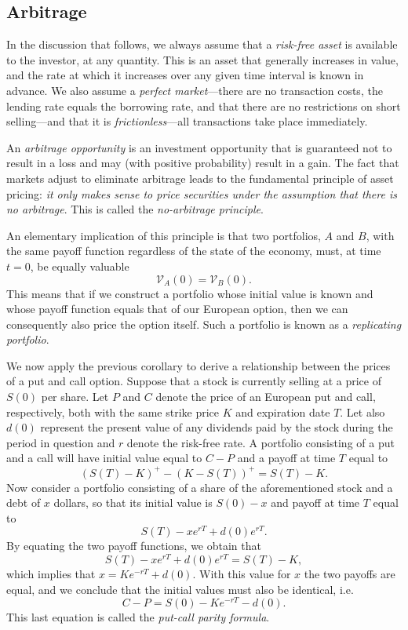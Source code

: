 \documentclass[]{article}
\theoremstyle{definition}
\theoremstyle{remark}
\begin{document}
\subsection{Arbitrage}
In the discussion that follows, we always assume that a \textit{risk-free asset} is available to the investor, at any quantity. This is an asset that generally increases in value, and the rate at which it increases over any given time interval is known in advance. We also assume a \textit{perfect market}---there are no transaction costs, the lending rate equals the borrowing rate, and that there are no restrictions on short selling---and that it is \textit{frictionless}---all transactions take place immediately.
\par
An \textit{arbitrage opportunity} is an investment opportunity that is guaranteed not to result in a loss and may (with positive probability) result in a gain. The fact that markets adjust to eliminate arbitrage leads to the fundamental principle of asset pricing: \textit{it only makes sense to price securities under the assumption that there is no arbitrage}. This is called the \textit{no-arbitrage principle}.
\par 
An elementary implication of this principle is that two portfolios, $A$ and $B$, with the same payoff function regardless of the state of the economy, must, at time $t=0$, be equally valuable\cite{roman2013introduction}
\[\mathcal{V}_{A}(0) = \mathcal{V}_B (0). \]
This means that if we construct a portfolio whose initial value is known and whose payoff function equals that of our European option, then we can consequently also price the option itself. Such a portfolio is known as a \textit{replicating portfolio}.
\par We now apply the previous corollary to derive a relationship between the prices of a put and call option. Suppose that a stock is currently selling at a price of $S(0)$ per share. Let $P$ and $C$ denote the price of an European put and call, respectively, both with the same strike price $K$ and expiration date $T$. Let also $d(0)$ represent the present value of any dividends paid by the stock during the period in question and $r$ denote the risk-free rate. A portfolio consisting of a put and a call will have initial value equal to $C-P$ and a payoff at time $T$ equal to
\[(S(T) - K)^+ -(K-S(T))^+ = S(T)-K.\]
Now consider a portfolio consisting of a share of the aforementioned stock and a debt of $x$ dollars, so that its initial value is $S(0)-x$ and payoff at time $T$ equal to
\[  S(T) - x e^{rT} +d(0) e^{r T}. \]
By equating the two payoff functions, we obtain that
\[
S(T) - x e^{rT} +d(0) e^{r T} = S(T) - K,
\]
which implies that $x=K e^{-rT} + d(0)$. With this value for $x$ the two payoffs are equal, and we conclude that the initial values must also be identical, i.e.
\[ C-P = S(0) - Ke^{-rT} - d(0). \]
This last equation is called the \textit{put-call parity formula}.
\end{document}
